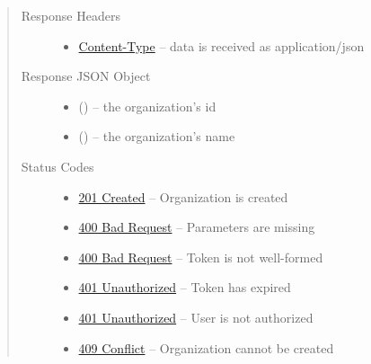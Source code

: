 \documentclass[letterpaper,10pt,english]{sphinxmanual}
\begin{document}
\begin{fulllineitems}
\begin{quote}
\begin{description}
\item[{Response Headers}] \leavevmode\begin{itemize}
\item {} 
\href{http://tools.ietf.org/html/rfc7231\#section-3.1.1.5}{Content-Type} -- data is received as application/json

\end{itemize}

\item[{Response JSON Object}] \leavevmode\begin{itemize}
\item {} 
 () -- the organization's id

\item {} 
 () -- the organization's name

\end{itemize}

\item[{Status Codes}] \leavevmode\begin{itemize}
\item {} 
\href{http://www.w3.org/Protocols/rfc2616/rfc2616-sec10.html\#sec10.2.2}{201 Created} -- Organization is created

\item {} 
\href{http://www.w3.org/Protocols/rfc2616/rfc2616-sec10.html\#sec10.4.1}{400 Bad Request} -- Parameters are missing

\item {} 
\href{http://www.w3.org/Protocols/rfc2616/rfc2616-sec10.html\#sec10.4.1}{400 Bad Request} -- Token is not well-formed

\item {} 
\href{http://www.w3.org/Protocols/rfc2616/rfc2616-sec10.html\#sec10.4.2}{401 Unauthorized} -- Token has expired

\item {} 
\href{http://www.w3.org/Protocols/rfc2616/rfc2616-sec10.html\#sec10.4.2}{401 Unauthorized} -- User is not authorized

\item {} 
\href{http://www.w3.org/Protocols/rfc2616/rfc2616-sec10.html\#sec10.4.10}{409 Conflict} -- Organization cannot be created

\end{itemize}

\end{description}\end{quote}

\end{fulllineitems}
\end{document}
